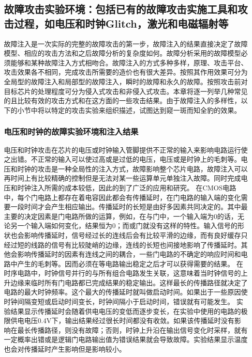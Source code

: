 \documentclass[a4paper,12pt]{article}
\begin{document}
\begin{CJK}{UTF8}{gkai}
\subsection{故障攻击实验环境：包括已有的故障攻击实施工具和攻击过程，如电压和时钟Glitch，激光和电磁辐射等}
故障注入是一次实际的完整的故障攻击的第一步，故障注入的结果直接决定了故障模型、相应的攻击方法和之后故障分析的复杂度如何。故障分析采用的故障模型必须能够和某种故障注入方式相吻合。故障注入的方式多种多样，原理、攻击平台、攻击效果各不相同，完成攻击所需要的造价也有很大差异。按照其作用效果可分为全局型的故障注入和局部型的故障注入，瞬时的故障和永久的故障。按照攻击前对目标芯片的处理程度可分为侵入式攻击和非侵入式攻击。本章将逐一列举几种常见的且比较有效的攻击方式和在这方面的一些攻击结果。由于故障注入的多样性，以下的小节中将以特定的攻击实验来组织描述，试图达到窥一斑而知全豹的效果。

\subsubsection{电压和时钟的故障实验环境和注入结果}

电压和时钟攻击在芯片的电压或时钟输入管脚提供不正常的输入来影响电路运行使之出错。不正常的输入可以使过高或是过低的电压，电压或是时钟上的毛刺等。电压和时钟的攻击是一种全局性的注入方式，故障影响整个芯片电路，故障注入可以再时间上有比较精确的控制但是无法对某一些运算单元单独注入故障。同时完成电压和时钟注入所需的成本较低，因此的到了广泛的应用和研究。
在CMOS电路中，每个门电路上都存在着电容因此都会有传播延时，在门电路的输入端的变化需要一段时间才会产生相应输出。传播延时的长短是由好多因素共同决定的。其中最主要的决定因素是门电路所做的运算，例如，在与门中，一个输入端为0的话，无论另一个输入端如何变化，结果恒为0；而或门就没有这样的特性。输入信号的形状也会影响传播延时，信号经过长的连线后会有比较平滑的边缘，而有良好缓存只经过短的线路的信号有比较陡峭的边缘，连线的长短也间接地影响了传播延时。其他会影响传播延时的因素有连线之间的耦合，一些门电路的不确定的响应时间和电路中产生的毛刺等。因而必须在等电路输出稳定之后才可以获得需要的结果。
在时序电路中，时钟信号并行的与所有组合电路发生关联，这意味着当时钟信号的上升边缘来临时所有门电路都已完成结果的稳定输出。这样最长的传播路径就决定了电路的最大时钟频率。这个最大的传播延时就叫做启动时间。如果出于一些原因使时钟间隔变短或启动时间变长，时钟间隔小于启动时间，错误就有可能发生。
实验结果显示传播延时会随着供电电压的变低而逐步变长，在实验中使用的电路的极限供电电压0.4V下，输出结果经过很长时间都没有收敛。如果该传播延时没有影响在最长传播路径，则没有故障；否则，时钟上升沿在输出信号变化时采样，就有一定概率出错或是逻辑门电路输出值为错误结果就会导致故障。实验结果显示温度也会对传播延时产生影响但是影响较小。


\end{CJK}
\end{document}
